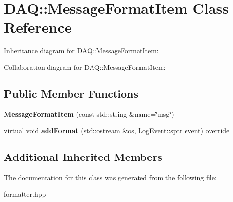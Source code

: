 \hypertarget{classDAQ_1_1MessageFormatItem}{}\section{D\+AQ\+:\+:Message\+Format\+Item Class Reference}
\label{classDAQ_1_1MessageFormatItem}


Inheritance diagram for D\+AQ\+:\+:Message\+Format\+Item\+:


Collaboration diagram for D\+AQ\+:\+:Message\+Format\+Item\+:
\subsection*{Public Member Functions}
\begin{DoxyCompactItemize}
\item 
\mbox{\label{classDAQ_1_1MessageFormatItem_a089a0478ce6b4f03a2e268227d300d8d}} 
{\bfseries Message\+Format\+Item} (const std\+::string \&name=\char`\"{}msg\char`\"{})
\item 
\mbox{\label{classDAQ_1_1MessageFormatItem_a37708f512d9543efc51daddc37750730}} 
virtual void {\bfseries add\+Format} (std\+::ostream \&os, Log\+Event\+::sptr event) override
\end{DoxyCompactItemize}
\subsection*{Additional Inherited Members}


The documentation for this class was generated from the following file\+:\begin{DoxyCompactItemize}
\item 
formatter.\+hpp\end{DoxyCompactItemize}

